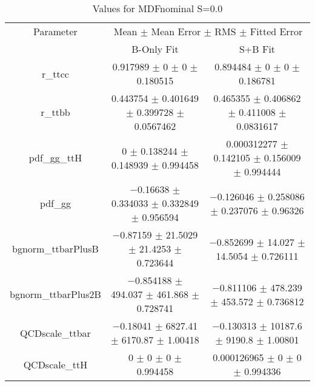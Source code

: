 \begin{table}
\centering
\caption{Values for MDFnominal S=0.0}
\begin{tabular}{ccc}
\toprule
Parameter & \multicolumn{2}{c}{Mean $\pm$ Mean Error $\pm$ RMS $\pm$ Fitted Error}\\
 & B-Only Fit & S+B Fit\\
\midrule
r\_ttcc & \num{0.917989} $\pm$ \num{0} $\pm$ \num{0} $\pm$ \num{0.180515} & \num{0.894484} $\pm$ \num{0} $\pm$ \num{0} $\pm$ \num{0.186781}\\
r\_ttbb & \num{0.443754} $\pm$ \num{0.401649} $\pm$ \num{0.399728} $\pm$ \num{0.0567462} & \num{0.465355} $\pm$ \num{0.406862} $\pm$ \num{0.411008} $\pm$ \num{0.0831617}\\
pdf\_gg\_ttH & \num{0} $\pm$ \num{0.138244} $\pm$ \num{0.148939} $\pm$ \num{0.994458} & \num{0.000312277} $\pm$ \num{0.142105} $\pm$ \num{0.156009} $\pm$ \num{0.994444}\\
pdf\_gg & \num{-0.16638} $\pm$ \num{0.334033} $\pm$ \num{0.332849} $\pm$ \num{0.956594} & \num{-0.126046} $\pm$ \num{0.258086} $\pm$ \num{0.237076} $\pm$ \num{0.96326}\\
bgnorm\_ttbarPlusB & \num{-0.87159} $\pm$ \num{21.5029} $\pm$ \num{21.4253} $\pm$ \num{0.723644} & \num{-0.852699} $\pm$ \num{14.027} $\pm$ \num{14.5054} $\pm$ \num{0.726111}\\
bgnorm\_ttbarPlus2B & \num{-0.854188} $\pm$ \num{494.037} $\pm$ \num{461.868} $\pm$ \num{0.728741} & \num{-0.811106} $\pm$ \num{478.239} $\pm$ \num{453.572} $\pm$ \num{0.736812}\\
QCDscale\_ttbar & \num{-0.18041} $\pm$ \num{6827.41} $\pm$ \num{6170.87} $\pm$ \num{1.00418} & \num{-0.130313} $\pm$ \num{10187.6} $\pm$ \num{9190.8} $\pm$ \num{1.00801}\\
QCDscale\_ttH & \num{0} $\pm$ \num{0} $\pm$ \num{0} $\pm$ \num{0.994458} & \num{0.000126965} $\pm$ \num{0} $\pm$ \num{0} $\pm$ \num{0.994336}\\
\bottomrule
\end{tabular}
\end{table}